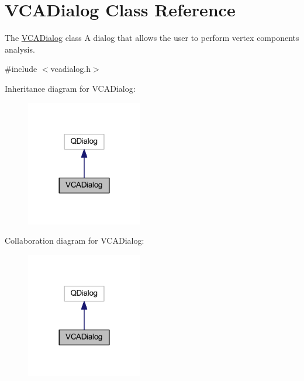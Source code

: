 \hypertarget{class_v_c_a_dialog}{\section{V\+C\+A\+Dialog Class Reference}
\label{class_v_c_a_dialog}
}


The \hyperlink{class_v_c_a_dialog}{V\+C\+A\+Dialog} class A dialog that allows the user to perform vertex components analysis.  




{\ttfamily \#include $<$vcadialog.\+h$>$}



Inheritance diagram for V\+C\+A\+Dialog\+:\nopagebreak
\begin{figure}[H]
\begin{center}
\leavevmode
\includegraphics[width=144pt]{class_v_c_a_dialog__inherit__graph}
\end{center}
\end{figure}


Collaboration diagram for V\+C\+A\+Dialog\+:\nopagebreak
\begin{figure}[H]
\begin{center}
\leavevmode
\includegraphics[width=144pt]{class_v_c_a_dialog__coll__graph}
\end{center}
\end{figure}
